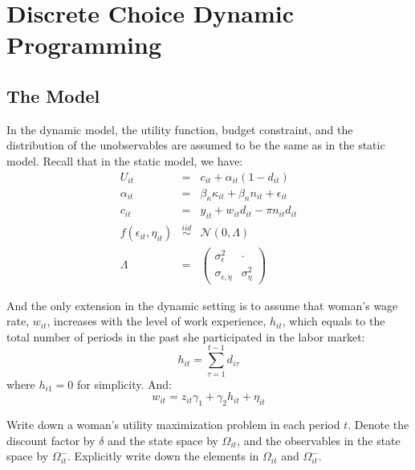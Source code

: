\section{Discrete Choice Dynamic Programming}
\subsection{The Model}

\indent In the dynamic model, the utility function, budget constraint, and the distribution of the unobservables are assumed to be the same as in the static model. Recall that in the static model, we have:
\begin{eqnarray}
U_{it} &=& c_{it} + \alpha_{it} (1 - d_{it})\\
\alpha_{it} &=& \beta_{\kappa} \kappa_{it} + \beta_{n} n_{it} + \epsilon_{it}\\
c_{it} &=& y_{it} + w_{it} d_{it} - \pi n_{it} d_{it}\\
f \left( \epsilon_{it}, \eta_{it} \right) & \overset{iid}{\sim} & \mathcal{N} \left( 0, \Lambda \right)\\
\Lambda &=& \left( \begin{array}{cc} 
\sigma_{\epsilon}^2 & \cdot \\
\sigma_{\epsilon, \eta} & \sigma_{\eta}^2
\end{array} \right)
\end{eqnarray}

And the only extension in the dynamic setting is to assume that woman's wage rate, $w_{it}$, increases with the level of work experience, $h_{it}$, which equals to the total number of periods in the past she participated in the labor market:
\begin{equation}
h_{it} = \sum\limits_{\tau=1}^{t-1} d_{i\tau} 
\end{equation} 
\noindent where $h_{i1} = 0$ for simplicity. And:
\begin{equation}
w_{it} = z_{it}\gamma_{1} + \gamma_{2}h_{it} + \eta_{it}
\end{equation} 


\begin{exercise}
Write down a woman's utility maximization problem in each period $t$. Denote the discount factor by  $\delta$ and the state space by $\Omega_{it}$, and the observables in the state space by $\Omega_{it}^-$. Explicitly write down the elements in $\Omega_{it}$ and $\Omega_{it}^-$.
\end{exercise}

